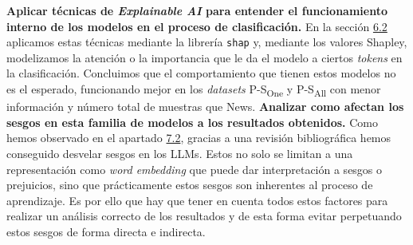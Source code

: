 \textbf{Aplicar técnicas de \textit{Explainable AI} para entender el funcionamiento interno de los modelos en el proceso de clasificación.} En la sección \hyperref[sec:shap]{6.2} aplicamos estas técnicas mediante la librería \texttt{shap} y, mediante los valores Shapley, modelizamos la atención o la importancia que le da el modelo a ciertos \textit{tokens} en la clasificación. Concluimos que el comportamiento que tienen estos modelos no es el esperado, funcionando mejor en los \textit{datasets} {P-S}\textsubscript{One} y {P-S}\textsubscript{All} con menor información y número total de muestras que News. 
\newpage
\textbf{Analizar como afectan los sesgos en esta familia de modelos a los resultados obtenidos.} Como hemos observado en el apartado \hyperref[sec:biases]{7.2}, gracias a una revisión bibliográfica hemos conseguido desvelar sesgos en los LLMs. Estos no solo se limitan a una representación como \textit{word embedding} que puede dar interpretación a sesgos o prejuicios, sino que prácticamente estos sesgos son inherentes al proceso de aprendizaje. Es por ello que hay que tener en cuenta todos estos factores para realizar un análisis correcto de los resultados y de esta forma evitar perpetuando estos sesgos de forma directa e indirecta.
